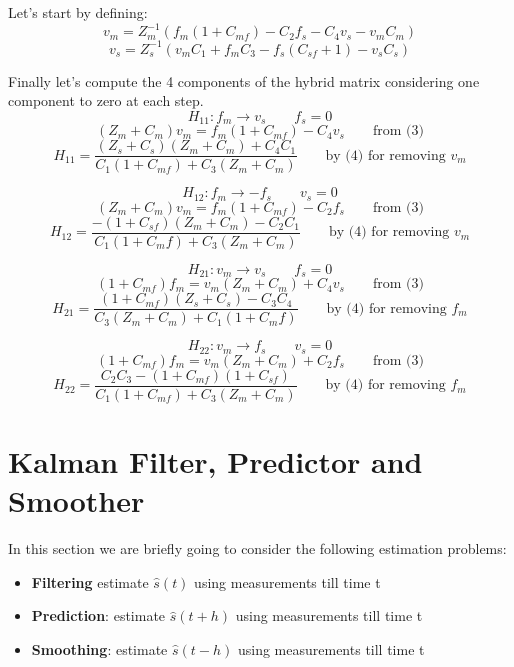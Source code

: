 \documentclass[a4paper,12pt]{article}
\begin{document}
\noindent Let's start by defining:
\begin{equation}
    v_m = Z_{m}^{-1}(f_m(1+C_{mf}) - C_2f_s - C_4v_s-v_mC_m)
\end{equation}
\begin{equation}
    v_s = Z_{s}^{-1}(v_mC_1 + f_mC_3 - f_s(C_{sf}+1) - v_sC_s)
\end{equation}

\noindent Finally let's compute the 4 components of the hybrid matrix considering one component to zero at each step.
\[
    H_{11} : f_m \rightarrow v_s \qquad f_s = 0
    \]\[
    (Z_m + C_m)v_m = f_m(1+C_{mf}) - C_4v_s \qquad \text{from (3)}
\]\[
    H_{11} = \frac{(Z_s+C_s)(Z_m+C_m) +C_4C_1}{C_1(1+C_{mf}) + C_3(Z_m+C_m)}  \qquad \text{by (4) for removing } v_m
\]


\bigskip

\[
    H_{12} : f_m \rightarrow -f_s \qquad v_s = 0
    \]\[
        (Z_m + C_m)v_m = f_m(1+C_{mf}) - C_2f_s \qquad \text{from (3)}
\]\[
    H_{12} = \frac{-(1+C_{sf})(Z_m+C_m) - C_2C_1}{C_1(1+C_mf)+C_3(Z_m+C_m)} \qquad \text{by (4) for removing } v_m
\]

\bigskip

\[
    H_{21} : v_m \rightarrow v_s \qquad f_s = 0
    \]\[
    (1+C_{mf})f_m = v_m(Z_m + C_m) + C_4v_s \qquad \text{from (3)}
\]\[
    H_{21} = \frac{(1+C_{mf})(Z_s + C_s) - C_3C_4}{C_3(Z_m + C_m)+ C_1(1+C_mf)} \qquad \text{by (4) for removing } f_m
\]


\bigskip

\[
    H_{22} : v_m \rightarrow f_s \qquad v_s = 0
\]\[
    (1+C_{mf})f_m = v_m(Z_m + C_m) + C_2f_s \qquad \text{from (3)}
\]\[
    H_{22} = \frac{C_2C_3 - (1+C_{mf})(1+C_{sf})}{C_1(1+C_{mf}) + C_3(Z_m+C_m)}  \qquad \text{by (4) for  removing } f_m
\]

\section{Kalman Filter, Predictor and Smoother}
In this section we are briefly going to consider the following estimation problems:
\begin{itemize}
    \item \textbf{Filtering} estimate $\hat{s}(t)$ using measurements till time t
    \item \textbf{Prediction}: estimate $\hat{s}(t+h)$ using measurements till time t
    \item \textbf{Smoothing}: estimate $\hat{s}(t-h)$ using measurements till time t
\end{itemize}
\bigskip
\end{document}
